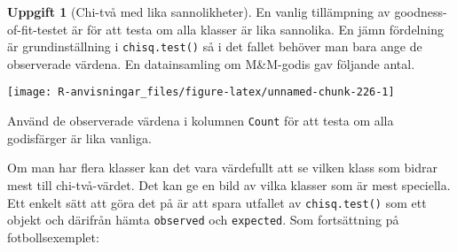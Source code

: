 \documentclass[
]{book}
\newenvironment{Shaded}{\begin{snugshade}}{\end{snugshade}}
\newcommand{\AttributeTok}[1]{\textcolor[rgb]{0.77,0.63,0.00}{#1}}
\newcommand{\DecValTok}[1]{\textcolor[rgb]{0.00,0.00,0.81}{#1}}
\newcommand{\FloatTok}[1]{\textcolor[rgb]{0.00,0.00,0.81}{#1}}
\newcommand{\FunctionTok}[1]{\textcolor[rgb]{0.00,0.00,0.00}{#1}}
\newcommand{\NormalTok}[1]{#1}
\newcommand{\OtherTok}[1]{\textcolor[rgb]{0.56,0.35,0.01}{#1}}
\newcommand{\SpecialCharTok}[1]{\textcolor[rgb]{0.00,0.00,0.00}{#1}}
\newcommand{\StringTok}[1]{\textcolor[rgb]{0.31,0.60,0.02}{#1}}
\theoremstyle{definition}
\theoremstyle{definition}
\theoremstyle{definition}
\newtheorem{exercise}{Uppgift}[chapter]
\theoremstyle{definition}
\theoremstyle{remark}
\begin{document}
\begin{exercise}[Chi-två med lika sannolikheter]
En vanlig tillämpning av goodness-of-fit-testet är för att testa om alla klasser är lika sannolika. En jämn fördelning är grundinställning i \texttt{chisq.test()} så i det fallet behöver man bara ange de observerade värdena. En datainsamling om M\&M-godis gav följande antal.

\begin{Shaded}
\end{Shaded}

\begin{center}\texttt{[image: R-anvisningar\_files/figure-latex/unnamed-chunk-226-1]} \end{center}

Använd de observerade värdena i kolumnen \texttt{Count} för att testa om alla godisfärger är lika vanliga.
\end{exercise}

Om man har flera klasser kan det vara värdefullt att se vilken klass som bidrar mest till chi-två-värdet. Det kan ge en bild av vilka klasser som är mest speciella. Ett enkelt sätt att göra det på är att spara utfallet av \texttt{chisq.test()} som ett objekt och därifrån hämta \texttt{observed} och \texttt{expected}. Som fortsättning på fotbollsexemplet:

\begin{Shaded}
\end{Shaded}
\end{document}
